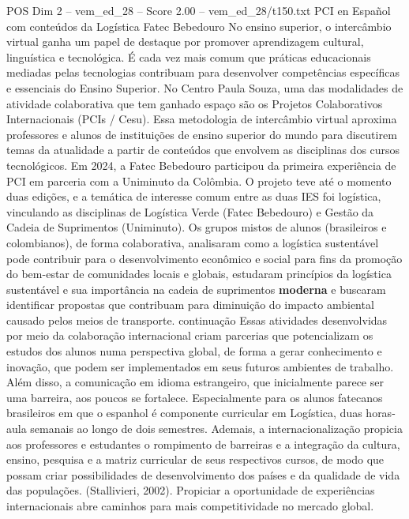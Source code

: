 \begin{textsample}{POS Dim 2 – vem\_ed\_28 – Score 2.00 – vem\_ed\_28/t150.txt}  \label{ex:f2_pos_012}
PCI en Español com conteúdos da Logística Fatec Bebedouro No ensino superior, o intercâmbio virtual ganha um papel de destaque por promover aprendizagem cultural, linguística e tecnológica.
É cada vez mais comum que práticas educacionais mediadas pelas tecnologias contribuam para desenvolver competências específicas e essenciais do Ensino Superior.
No Centro Paula Souza, uma das modalidades de atividade colaborativa que tem ganhado espaço são os Projetos Colaborativos Internacionais (PCIs / Cesu).
Essa metodologia de intercâmbio virtual aproxima professores e alunos de instituições de ensino superior do mundo para discutirem temas da atualidade a partir de conteúdos que envolvem as disciplinas dos cursos tecnológicos.
Em 2024, a Fatec Bebedouro participou da primeira experiência de PCI em parceria com a Uniminuto da Colômbia.
O projeto teve até o momento duas edições, e a temática de interesse comum entre as duas IES foi logística, vinculando as disciplinas de Logística Verde (Fatec Bebedouro) e Gestão da Cadeia de Suprimentos (Uniminuto).
Os grupos mistos de alunos (brasileiros e colombianos), de forma colaborativa, analisaram como a logística sustentável pode contribuir para o desenvolvimento econômico e social para fins da promoção do bem-estar de comunidades locais e globais, estudaram princípios da logística sustentável e sua importância na cadeia de suprimentos \textbf{moderna} e buscaram identificar propostas que contribuam para diminuição do impacto ambiental causado pelos meios de transporte. continuação Essas atividades desenvolvidas por meio da colaboração internacional criam parcerias que potencializam os estudos dos alunos numa perspectiva global, de forma a gerar conhecimento e inovação, que podem ser implementados em seus futuros ambientes de trabalho.
Além disso, a comunicação em idioma estrangeiro, que inicialmente parece ser uma barreira, aos poucos se fortalece.
Especialmente para os alunos fatecanos brasileiros em que o espanhol é componente curricular em Logística, duas horas-aula semanais ao longo de dois semestres.
Ademais, a internacionalização propicia aos professores e estudantes o rompimento de barreiras e a integração da cultura, ensino, pesquisa e a matriz curricular de seus respectivos cursos, de modo que possam criar possibilidades de desenvolvimento dos países e da qualidade de vida das populações. (Stallivieri, 2002).
Propiciar a oportunidade de experiências internacionais abre caminhos para mais competitividade no mercado global.

\end{textsample}
